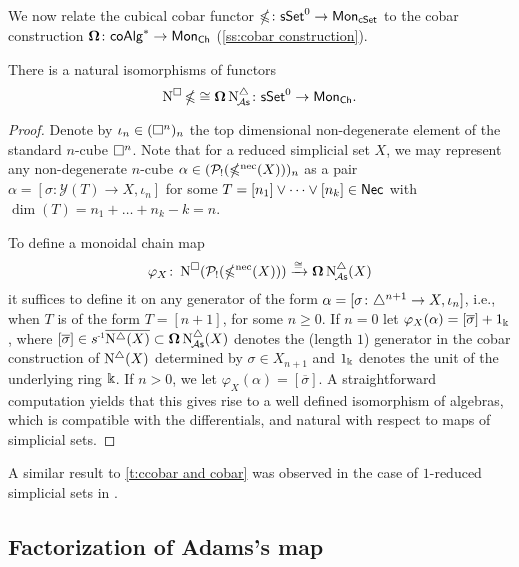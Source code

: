 We now relate the cubical cobar functor $\operatorname{\mathbb{\Omega}} \colon \mathsf{sSet}^0 \to \mathsf{Mon}_{\mathsf{cSet}}$ to the cobar construction $\operatorname{\mathbf{\Omega}} \colon \mathsf{coAlg}^\ast \to \mathsf{Mon}_{\mathsf{Ch}}$ (\cref{ss:cobar construction}).

\begin{theorem}\label{t:ccobar and cobar}
	There is a natural isomorphisms of functors
	\[
	\operatorname{N^{\square}} \operatorname{\mathbb{\Omega}} \cong \operatorname{\mathbf{\Omega}} \operatorname{N^{\triangle}_{\!{\mathcal{A}\mathsf{s}}}} \colon \mathsf{sSet}^0 \to \mathsf{Mon}_{\mathsf{Ch}}.
	\]
\end{theorem}

\begin{proof}
	Denote by $\iota_n \in (\square^n)_n$ the top dimensional non-degenerate element of the standard $n$-cube $\square^n$.
	Note that for a reduced simplicial set $X$, we may represent any non-degenerate $n$-cube $\alpha \in (\mathcal{P}_!(\operatorname{\mathbb{\Omega}^{\mathrm{nec}}}(X)))_n$ as a pair $\alpha = [\sigma \colon \mathcal{Y}(T) \to X, \iota_n]$ for some $T = [n_1] \vee \dots \vee [n_k] \in \mathsf{Nec}$ with $\dim(T) = n_1 + \dots + n_k - k = n$.

	To define a monoidal chain map
	\[
	\varphi_X \colon \operatorname{N^{\square}}(\mathcal{P}_!(\operatorname{\mathbb{\Omega}^{\mathrm{nec}}}(X))) \xrightarrow{\cong} \operatorname{\mathbf{\Omega}} \operatorname{N^{\triangle}_{\!{\mathcal{A}\mathsf{s}}}}(X)
	\]
	it suffices to define it on any generator of the form $\alpha=[\sigma \colon \triangle^{n+1} \to X, \iota_{n}]$, i.e., when $T$ is of the form $T = [n+1]$, for some $n \geq 0$.
	If $n = 0$ let $\varphi_X(\alpha)= [\overline{\sigma}] + 1_\Bbbk$, where $[\overline{\sigma}] \in \s{-1} \overline{ \schains(X)} \subset \cobar \schainsA(X)$ denotes the (length $1$) generator in the cobar construction of $\operatorname{N^{\triangle}}(X)$ determined by $\sigma \in X_{n+1}$ and $1_\Bbbk$ denotes the unit of the underlying ring $\Bbbk$.
	If $n > 0$, we let $\varphi_X(\alpha)=[\overline{\sigma}]$.
	A straightforward computation yields that this gives rise to a well defined isomorphism of algebras, which is compatible with the differentials, and natural with respect to maps of simplicial sets.
\end{proof}

A similar result to \cref{t:ccobar and cobar} was observed in the case of $1$-reduced simplicial sets in \cite[Section~3.5]{berger1995loops}.

\subsection{Factorization of Adams's map}\label{ss:factorization of adams}

